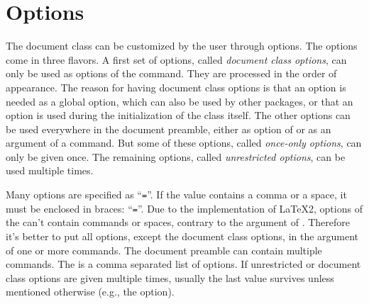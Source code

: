 \section{Options}\label{sec:options}
The document class can be customized by the user through options. The
options come in three flavors. A first set of options, called
\emph{document class options}, can only be used as options of the
 command. They are processed in the order of appearance.
The reason for having document class options is that an option is needed as
a global option, which can also be used by other packages, or that an
option is used during the initialization of the class itself. The other
options can be used everywhere in the document preamble, either as
option of  or as an argument of a  command. But
some of these options, called \emph{once-only options}, can only be given
once. The remaining options, called \emph{unrestricted options}, can be
used multiple times.

Many options are specified as ``\texttt{=}''. If the
value contains a comma or a space, it must be enclosed in braces:
``\texttt{=}''. Due to the implementation of LaTeX2,
options of the  can't contain commands or spaces,
contrary to the argument of \label{com:setup}. Therefore it's
better to put all options, except the document class options, in the
argument of one or more  commands. The document preamble can
contain multiple  commands. The
 is a comma separated list of options. If unrestricted or
document class options are given multiple times, usually the last value
survives unless mentioned otherwise (e.g., the  option).

